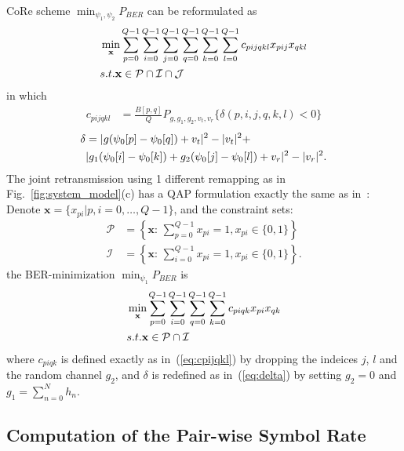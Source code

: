 \documentclass[conference]{IEEEtran}
\begin{document}
CoRe scheme $\min_{\psi_1, \psi_2}P_{BER}$ can be reformulated as
\begin{align}
    & \min_{\mathbf{x}}\sum_{p=0}^{Q-1}\sum_{i=0}^{Q-1}\sum_{j=0}^{Q-1}
    \sum_{q=0}^{Q-1}\sum_{k=0}^{Q-1}\sum_{l=0}^{Q-1}c_{pijqkl}x_{pij}x_{qkl}
    \label{eq:Q3AP}\\
    & \mbox{s.t. } \mathbf{x}\in \mathcal{P}\cap\mathcal{I}\cap\mathcal{J}
    \notag
\end{align}
in which
\begin{align}
    c_{pijqkl} & = \frac{B[p, q]}{Q}P_{g,g_1,g_2,v_t,v_r}\{\delta(p,i,j,q,k,l)
    < 0\}
    \label{eq:cpijqkl}
\end{align}
\begin{align}
    \delta & = |g(\psi_0[p] - \psi_0[q]) + v_t|^2 - |v_t|^2 +\notag
    \\
    &
    |g_1(\psi_0[i] - \psi_0[k])+g_2(\psi_0[j] - \psi_0[l])+v_r|^2 -
    |v_r|^2.\label{eq:delta_pijqkl}
\end{align}
The joint retransmission using 1 different remapping as in
Fig.~\ref{fig:system_model}(c) has a QAP formulation exactly the same as
in~\cite{harvind2005symbol}: Denote  $\mathbf{x} = \{x_{pi}|p,i=0,\ldots,Q-1\}$,
and the constraint sets:
\begin{subequations}
    \begin{align}
        \mathcal{P} & = \left\{\mathbf{x}:\,\sum_{p=0}^{Q-1}x_{pi} = 1,
        x_{pi}\in\{0, 1\}\right\}
        \\
        \mathcal{I} & = \left\{\mathbf{x}:\,\sum_{i=0}^{Q-1}x_{pi} = 1,
        x_{pi}\in\{0, 1\}\right\}.
    \end{align}
\end{subequations}
the BER-minimization $\min_{\psi_1}P_{BER}$ is
\begin{align}
    & \min_{\mathbf{x}}\sum_{p=0}^{Q-1}\sum_{i=0}^{Q-1}
    \sum_{q=0}^{Q-1}\sum_{k=0}^{Q-1}c_{piqk}x_{pi}x_{qk}
    \label{eq:QAP}\\
    & \mbox{s.t. } \mathbf{x}\in \mathcal{P}\cap\mathcal{I}
    \notag
\end{align}
where $c_{piqk}$ is defined exactly as in~(\ref{eq:cpijqkl}) by dropping the
indeices $j$, $l$ and the random channel $g_2$, and $\delta$ is redefined as
in~(\ref{eq:delta}) by setting $g_2 = 0$ and $g_1 = \sum_{n=0}^Nh_n$.

\subsection{Computation of the Pair-wise Symbol Rate}
\end{document}
